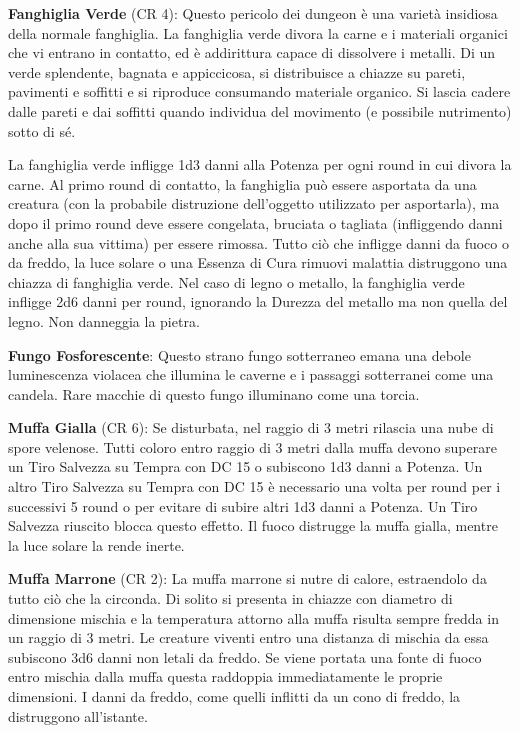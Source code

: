 \documentclass[a4paper,11pt,twoside,openany]{book}
\begin{document}
\textbf{Fanghiglia Verde} (CR 4): Questo pericolo dei dungeon è una varietà insidiosa della normale fanghiglia. La fanghiglia verde divora la carne e i materiali organici che vi entrano in contatto, ed è addirittura capace di dissolvere i metalli. Di un verde splendente, bagnata e appiccicosa, si distribuisce a chiazze su pareti, pavimenti e soffitti e si riproduce consumando materiale organico. Si lascia cadere dalle pareti e dai soffitti quando individua del movimento (e possibile nutrimento) sotto di sé.

La fanghiglia verde infligge 1d3 danni alla Potenza per ogni round in cui divora la carne. Al primo round di contatto, la fanghiglia può essere asportata da una creatura (con la probabile distruzione dell'oggetto utilizzato per asportarla), ma dopo il primo round deve essere congelata, bruciata o tagliata (infliggendo danni anche alla sua vittima) per essere rimossa. Tutto ciò che infligge danni da fuoco o da freddo, la luce solare o una Essenza di Cura rimuovi malattia distruggono una chiazza di fanghiglia verde. Nel caso di legno o metallo, la fanghiglia verde infligge 2d6 danni per round, ignorando la Durezza del metallo ma non quella del legno. Non danneggia la pietra.

\textbf{Fungo Fosforescente}: Questo strano fungo sotterraneo emana una debole luminescenza violacea che illumina le caverne e i passaggi sotterranei come una candela. Rare macchie di questo fungo illuminano come una torcia.

\textbf{Muffa Gialla} (CR 6): Se disturbata, nel raggio di 3 metri rilascia una nube di spore velenose. Tutti coloro entro raggio di 3 metri dalla muffa devono superare un Tiro Salvezza su Tempra con DC 15 o subiscono 1d3 danni a Potenza. Un altro Tiro Salvezza su Tempra con DC 15 è necessario una volta per round per i successivi 5 round o per evitare di subire altri 1d3 danni a Potenza. Un Tiro Salvezza riuscito blocca questo effetto. Il fuoco distrugge la muffa gialla, mentre la luce solare la rende inerte.

\textbf{Muffa Marrone} (CR 2): La muffa marrone si nutre di calore, estraendolo da tutto ciò che la circonda. Di solito si presenta in chiazze con diametro di dimensione mischia e la temperatura attorno alla muffa risulta sempre fredda in un raggio di 3 metri. Le creature viventi entro una distanza di mischia da essa subiscono 3d6 danni non letali da freddo. Se viene portata una fonte di fuoco entro mischia dalla muffa questa raddoppia immediatamente le proprie dimensioni. I danni da freddo, come quelli inflitti da un cono di freddo, la distruggono all'istante.
\end{document}

